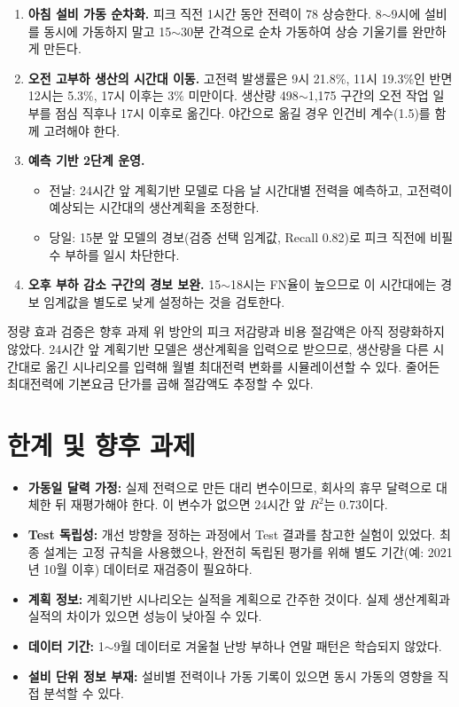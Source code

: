 \documentclass[11pt,a4paper]{article}
\begin{document}
\begin{enumerate}[label=\textbf{방안 \arabic*.},leftmargin=*]
  \item \textbf{아침 설비 가동 순차화.} 피크 직전 1시간 동안 전력이 78 상승한다. 8$\sim$9시에 설비를 동시에 가동하지 말고 15$\sim$30분 간격으로 순차 가동하여 상승 기울기를 완만하게 만든다.
  \item \textbf{오전 고부하 생산의 시간대 이동.} 고전력 발생률은 9시 21.8\%, 11시 19.3\%인 반면 12시는 5.3\%, 17시 이후는 3\% 미만이다. 생산량 498$\sim$1,175 구간의 오전 작업 일부를 점심 직후나 17시 이후로 옮긴다. 야간으로 옮길 경우 인건비 계수(1.5)를 함께 고려해야 한다.
  \item \textbf{예측 기반 2단계 운영.}
    \begin{itemize}
      \item 전날: 24시간 앞 계획기반 모델로 다음 날 시간대별 전력을 예측하고, 고전력이 예상되는 시간대의 생산계획을 조정한다.
      \item 당일: 15분 앞 모델의 경보(검증 선택 임계값, Recall 0.82)로 피크 직전에 비필수 부하를 일시 차단한다.
    \end{itemize}
  \item \textbf{오후 부하 감소 구간의 경보 보완.} 15$\sim$18시는 FN율이 높으므로 이 시간대에는 경보 임계값을 별도로 낮게 설정하는 것을 검토한다.
\end{enumerate}

\begin{warnbox}{정량 효과 검증은 향후 과제}
위 방안의 피크 저감량과 비용 절감액은 아직 정량화하지 않았다. 24시간 앞 계획기반 모델은 생산계획을 입력으로 받으므로, 생산량을 다른 시간대로 옮긴 시나리오를 입력해 월별 최대전력 변화를 시뮬레이션할 수 있다. 줄어든 최대전력에 기본요금 단가를 곱해 절감액도 추정할 수 있다.
\end{warnbox}

\section{한계 및 향후 과제}
\begin{itemize}
  \item \textbf{가동일 달력 가정:} 실제 전력으로 만든 대리 변수이므로, 회사의 휴무 달력으로 대체한 뒤 재평가해야 한다. 이 변수가 없으면 24시간 앞 $R^2$는 0.73이다.
  \item \textbf{Test 독립성:} 개선 방향을 정하는 과정에서 Test 결과를 참고한 실험이 있었다. 최종 설계는 고정 규칙을 사용했으나, 완전히 독립된 평가를 위해 별도 기간(예: 2021년 10월 이후) 데이터로 재검증이 필요하다.
  \item \textbf{계획 정보:} 계획기반 시나리오는 실적을 계획으로 간주한 것이다. 실제 생산계획과 실적의 차이가 있으면 성능이 낮아질 수 있다.
  \item \textbf{데이터 기간:} 1$\sim$9월 데이터로 겨울철 난방 부하나 연말 패턴은 학습되지 않았다.
  \item \textbf{설비 단위 정보 부재:} 설비별 전력이나 가동 기록이 있으면 동시 가동의 영향을 직접 분석할 수 있다.
\end{itemize}
\end{document}
